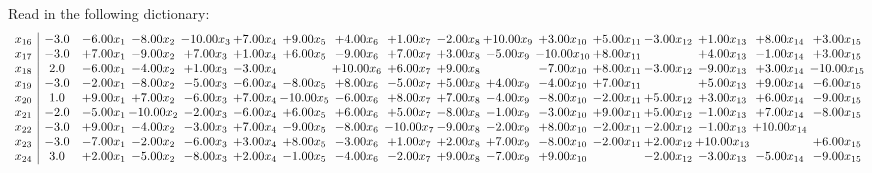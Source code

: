 \documentclass[9pt]{article}
\begin{document}
Read in the following dictionary:
\[\begin{array}{c| c c@{\hskip 2pt} c@{\hskip 2pt} c@{\hskip 2pt} c@{\hskip 2pt} c@{\hskip 2pt} c@{\hskip 2pt} c@{\hskip 2pt} c@{\hskip 2pt} c@{\hskip 2pt} c@{\hskip 2pt} c@{\hskip 2pt} c@{\hskip 2pt} c@{\hskip 2pt} c@{\hskip 2pt} c@{\hskip 2pt} }
 x_{16}   &  -3.0 & -6.00 x_{1} & -8.00 x_{2} & -10.00 x_{3} & +  7.00 x_{4} & +  9.00 x_{5} & +  4.00 x_{6} & +  1.00 x_{7} & -2.00 x_{8} & + 10.00 x_{9} & +  3.00 x_{10} & +  5.00 x_{11} & -3.00 x_{12} & +  1.00 x_{13} & +  8.00 x_{14} & +  3.00 x_{15}\\
 x_{17}   &  -3.0 & +  7.00 x_{1} & -9.00 x_{2} & +  7.00 x_{3} & +  1.00 x_{4} & +  6.00 x_{5} & -9.00 x_{6} & +  7.00 x_{7} & +  3.00 x_{8} & -5.00 x_{9} & -10.00 x_{10} & +  8.00 x_{11} &   & +  4.00 x_{13} & -1.00 x_{14} & +  3.00 x_{15}\\
 x_{18}   &  2.0 & -6.00 x_{1} & -4.00 x_{2} & +  1.00 x_{3} & -3.00 x_{4} &   & + 10.00 x_{6} & +  6.00 x_{7} & +  9.00 x_{8} &   & -7.00 x_{10} & +  8.00 x_{11} & -3.00 x_{12} & -9.00 x_{13} & +  3.00 x_{14} & -10.00 x_{15}\\
 x_{19}   &  -3.0 & -2.00 x_{1} & -8.00 x_{2} & -5.00 x_{3} & -6.00 x_{4} & -8.00 x_{5} & +  8.00 x_{6} & -5.00 x_{7} & +  5.00 x_{8} & +  4.00 x_{9} & -4.00 x_{10} & +  7.00 x_{11} &   & +  5.00 x_{13} & +  9.00 x_{14} & -6.00 x_{15}\\
 x_{20}   &  1.0 & +  9.00 x_{1} & +  7.00 x_{2} & -6.00 x_{3} & +  7.00 x_{4} & -10.00 x_{5} & -6.00 x_{6} & +  8.00 x_{7} & +  7.00 x_{8} & -4.00 x_{9} & -8.00 x_{10} & -2.00 x_{11} & +  5.00 x_{12} & +  3.00 x_{13} & +  6.00 x_{14} & -9.00 x_{15}\\
 x_{21}   &  -2.0 & -5.00 x_{1} & -10.00 x_{2} & -2.00 x_{3} & -6.00 x_{4} & +  6.00 x_{5} & +  6.00 x_{6} & +  5.00 x_{7} & -8.00 x_{8} & -1.00 x_{9} & -3.00 x_{10} & +  9.00 x_{11} & +  5.00 x_{12} & -1.00 x_{13} & +  7.00 x_{14} & -8.00 x_{15}\\
 x_{22}   &  -3.0 & +  9.00 x_{1} & -4.00 x_{2} & -3.00 x_{3} & +  7.00 x_{4} & -9.00 x_{5} & -8.00 x_{6} & -10.00 x_{7} & -9.00 x_{8} & -2.00 x_{9} & +  8.00 x_{10} & -2.00 x_{11} & -2.00 x_{12} & -1.00 x_{13} & + 10.00 x_{14} &   \\
 x_{23}   &  -3.0 & -7.00 x_{1} & -2.00 x_{2} & -6.00 x_{3} & +  3.00 x_{4} & +  8.00 x_{5} & -3.00 x_{6} & +  1.00 x_{7} & +  2.00 x_{8} & +  7.00 x_{9} & -8.00 x_{10} & -2.00 x_{11} & +  2.00 x_{12} & + 10.00 x_{13} &   & +  6.00 x_{15}\\
 x_{24}   &  3.0 & +  2.00 x_{1} & -5.00 x_{2} & -8.00 x_{3} & +  2.00 x_{4} & -1.00 x_{5} & -4.00 x_{6} & -2.00 x_{7} & +  9.00 x_{8} & -7.00 x_{9} & +  9.00 x_{10} &   & -2.00 x_{12} & -3.00 x_{13} & -5.00 x_{14} & -9.00 x_{15}\\

\end{array}\]
\end{document}
